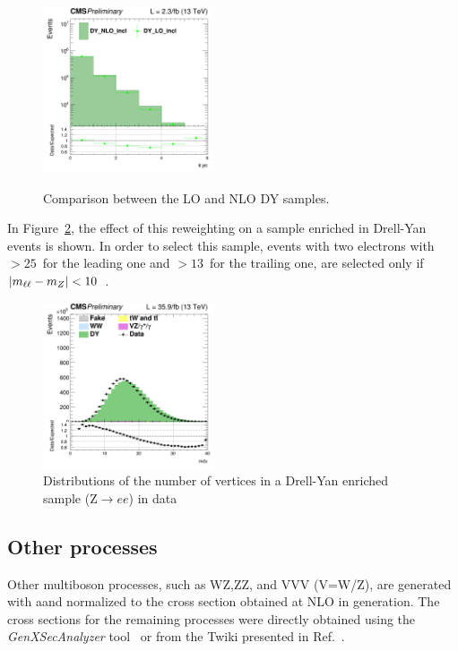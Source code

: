 \begin{figure}[htbp]
{\includegraphics[width=0.45\textwidth]{../AN/Figs/DY/LOvsNLO/log_cratio_dyee_13TeV_njet.png}
}
\caption{
    Comparison between the LO and NLO DY samples.}
    \label{fig:LOvsNLO}
\end{figure}


In Figure~\ref{Fig:pu}, the effect of this reweighting on a sample enriched in Drell-Yan events is shown.
In order to select this sample, 
events with two electrons with \pt$> 25$~\GeV for the leading one and  \pt$>
13$~\GeV for the trailing one, are selected only if  $|m_{\ell\ell} - m_Z| < 10$~\GeV. 

\begin{figure}[htbp]
\centering
\includegraphics[width=0.45\textwidth]{../AN/Figs/nvertices.png}
\caption{
    Distributions of the number of vertices in a Drell-Yan enriched sample
    (Z$\rightarrow{}ee$) in
    data}
    \label{Fig:pu}
\end{figure}





\subsection*{Other processes} Other multiboson processes, such as WZ,ZZ, and VVV (V=W/Z), are generated with a\MCATNLO and normalized
to the cross section obtained at NLO in generation.
The cross sections for the remaining processes were directly obtained using the \emph{GenXSecAnalyzer}
tool~\cite{genxsec} or from the Twiki presented in Ref.~\cite{25nstwiki}.



